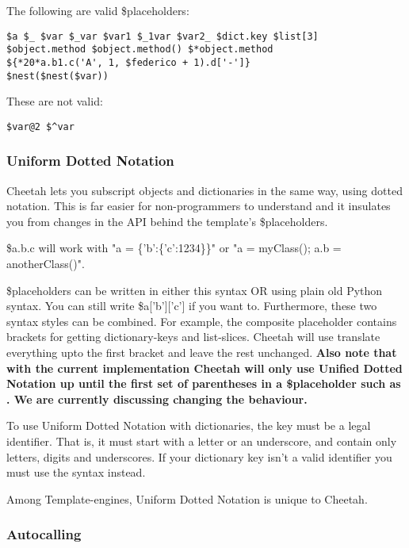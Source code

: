 The following are valid \$placeholders:
\begin{verbatim}
$a $_ $var $_var $var1 $_1var $var2_ $dict.key $list[3]
$object.method $object.method() $*object.method
${*20*a.b1.c('A', 1, $federico + 1).d['-']}
$nest($nest($var))
\end{verbatim}

These are not valid:
\begin{verbatim}
$var@2 $^var
\end{verbatim}
          
\subsubsection{Uniform Dotted Notation}
\label{TDL.placeholders.unifiedDottedNotation}

Cheetah lets you subscript objects and dictionaries in the same way, using
dotted notation.  This is far easier for non-programmers to understand and it
insulates you from changes in the API behind the template's \$placeholders.

\$a.b.c will work with "a = \{'b':\{'c':1234\}\}" or "a = myClass(); a.b =
anotherClass()". 

\$placeholders can be written in either this syntax OR using plain old Python
syntax.  You can still write \$a['b']['c'] if you want to. Furthermore, these
two syntax styles can be combined.  For example, the composite placeholder
 contains brackets for getting dictionary-keys and
list-slices. Cheetah will use translate everything upto the first bracket and
leave the rest unchanged. {\bf Also note that with the current implementation
  Cheetah will only use Unified Dotted Notation up until the first set of
  parentheses in a \$placeholder such as
  . We are currently discussing
  changing the behaviour.}

To use Uniform Dotted Notation with dictionaries, the key must be a legal
identifier.  That is, it must start with a letter or an underscore, and contain
only letters, digits and underscores.  If your dictionary key isn't a valid
identifier you must use the  syntax instead.

Among Template-engines, Uniform Dotted Notation is unique to Cheetah.

\subsubsection{Autocalling}
\label{TDL.placeholders.autocalling}

